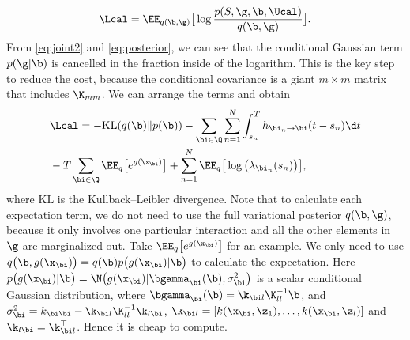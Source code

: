 \[
\Lcal = \EE_{q(\b,\g)}\big[ \log \frac{p(S, \g, \b, \Ucal)}{q(\b, \g)} \big] .
\]
From \eqref{eq:joint2} and \eqref{eq:posterior}, we can see that the conditional Gaussian term $p(\g|\b)$ is cancelled in the fraction inside of the logarithm. This is the key step to reduce the cost, because the conditional covariance is a giant $m \times m$ matrix that includes $\K_{mm}$. We can arrange the terms and obtain
\begin{align}
&\Lcal = -\mathrm{KL}(q(\b) \| p(\b)) -\sum_{\bi \in \Q}\sum_{n=1}^N \int_{s_n}^T h_{\bi_n \rightarrow \bi}(t-s_n) \d t\notag \\
& -T\sum_{\bi \in \Q}\EE_{q}\big[e^{g(\x_\bi)}\big] +\sum_{n=1}^N \EE_{q}\big[ \log\big(\lambda_{\bi_n}(s_n)\big)\big], \label{eq:elbo} %
\end{align}
where $\mathrm{KL}$ is the Kullback–Leibler divergence. Note that to calculate each expectation term, we do not need to use the full variational posterior $q(\b, \g)$, because it only involves one particular interaction and all the other elements in $\g$ are marginalized out. Take $\EE_{q}\big[e^{g(\x_\bi)}\big]$ for an example. We only need to use $q\big(\b, g(\x_{\bi})\big) = q(\b)p\big(g(\x_{\bi})|\b\big)$ to calculate the expectation. Here $p\big(g(\x_{\bi})|\b\big) = \N\big(g(\x_{\bi})|\bgamma_{\bi}(\b), \sigma^2_{\bi}\big)$ is a scalar conditional Gaussian distribution, where $\bgamma_{\bi}(\b) = \k_{\bi l} \K_{ll}^{-1} \b$, and $\sigma^2_{\bi} = k_{\bi\bi} - \k_{\bi l} \K_{ll}^{-1} \k_{l \bi}$,  $\k_{\bi l} = [k(\x_{\bi}, \z_1), \ldots, k(\x_{\bi}, \z_l)]$ and $\k_{l \bi} =\k_{\bi l}^\top$. Hence it is cheap to compute. 

